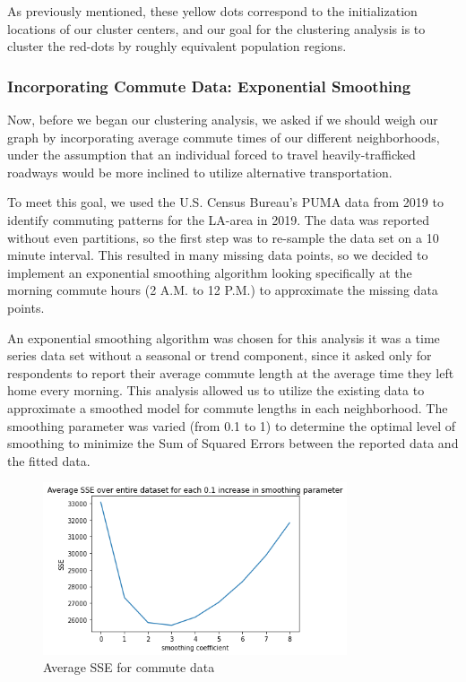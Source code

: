 \documentclass{article}
\begin{document}
As previously mentioned, these yellow dots correspond to the initialization locations of our cluster centers, and our goal for the clustering analysis is to cluster the red-dots by roughly equivalent population regions.

\subsubsection{Incorporating Commute Data: Exponential Smoothing}

Now, before we began our clustering analysis, we asked if we should weigh our graph by incorporating average commute times of our different neighborhoods, under the assumption that an individual forced to travel heavily-trafficked roadways would be more inclined to utilize alternative transportation.

To meet this goal, we used the U.S. Census Bureau's PUMA data from 2019 to identify commuting patterns for the LA-area in 2019. The data was reported without even partitions, so the first step was to re-sample the data set on a 10 minute interval. This resulted in many missing data points, so we decided to implement an exponential smoothing algorithm looking specifically at the morning commute hours (2 A.M. to 12 P.M.) to approximate the missing data points.

An exponential smoothing algorithm was chosen for this analysis it was a time series data set without a seasonal or trend component, since it asked only for respondents to report their average commute length at the average time they left home every morning. This analysis allowed us to utilize the existing data to approximate a smoothed model for commute lengths in each neighborhood. The smoothing parameter was varied (from 0.1 to 1) to determine the optimal level of smoothing to minimize the Sum of Squared Errors between the reported data and the fitted data.

\begin{figure}[ht]
\centering
\includegraphics[width=0.8\textwidth]{proj05.png}
\vspace*{-10mm}
\caption{Average SSE for commute data }
\label{fig:proj01}
\end{figure}
\end{document}
